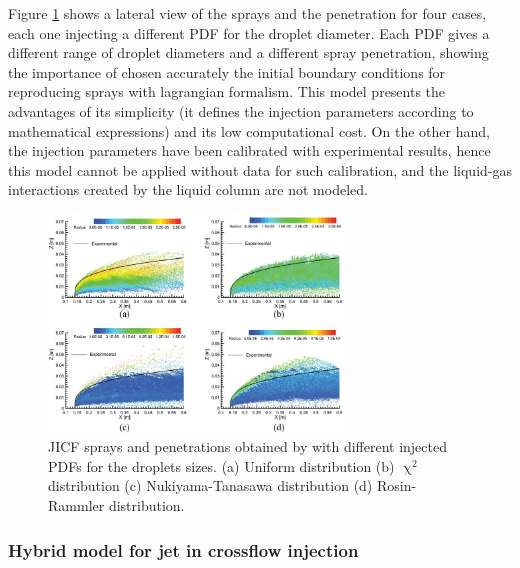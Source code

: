 Figure \ref{fig:fan_2018_jets_penetration} shows a lateral view of the sprays and the penetration for four cases, each one injecting a different PDF for the droplet diameter. Each PDF gives a different range of droplet diameters and a different spray penetration, showing the importance of chosen accurately the initial boundary conditions for reproducing sprays with lagrangian formalism. This model presents the advantages of its simplicity (it defines the injection parameters according to mathematical expressions) and its low computational cost. On the other hand, the injection parameters have been calibrated with experimental results, hence this model cannot be applied without data for such calibration, and the liquid-gas interactions created by the liquid column are not modeled.

\begin{figure}[ht]
    \centering
    \includegraphics[width=0.7\textwidth]{./part1_numerical_approaches/figures_ch3/fan_2018_jets_penetration}
       \centering
    \caption{JICF sprays and penetrations obtained by  with different injected PDFs for the droplets sizes. (a) Uniform distribution (b) $\upchi^2$ distribution (c) Nukiyama-Tanasawa distribution (d) Rosin-Rammler distribution.}
    \label{fig:fan_2018_jets_penetration}
\end{figure}



\subsubsection*{Hybrid model for jet in crossflow injection }

